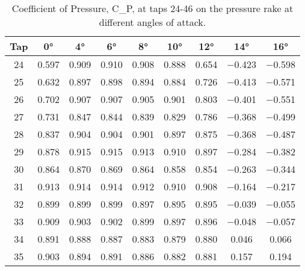\begin{table}[htpb]
    \caption{Coefficient of Pressure, \gls{C_P}, at taps 24-46 on the pressure rake at different angles of attack.}
    \label{tab:C_P_data_2}
    \centering
    \begin{tabular}{ccccccccc}
        \toprule
        Tap & \num{0}\unit{\degree} & \num{4}\unit{\degree} & \num{6}\unit{\degree} & \num{8}\unit{\degree} & \num{10}\unit{\degree} & \num{12}\unit{\degree} & \num{14}\unit{\degree} & \num{16}\unit{\degree}\\
        \midrule
        \num{24} & \num{0.597} & \num{0.909} & \num{0.910} & \num{0.908} & \num{0.888} & \num{0.654} & \num{-0.423} & \num{-0.598} \\
        \num{25} & \num{0.632} & \num{0.897} & \num{0.898} & \num{0.894} & \num{0.884} & \num{0.726} & \num{-0.413} & \num{-0.571} \\
        \num{26} & \num{0.702} & \num{0.907} & \num{0.907} & \num{0.905} & \num{0.901} & \num{0.803} & \num{-0.401} & \num{-0.551} \\
        \num{27} & \num{0.731} & \num{0.847} & \num{0.844} & \num{0.839} & \num{0.829} & \num{0.786} & \num{-0.368} & \num{-0.499} \\
        \num{28} & \num{0.837} & \num{0.904} & \num{0.904} & \num{0.901} & \num{0.897} & \num{0.875} & \num{-0.368} & \num{-0.487} \\
        \num{29} & \num{0.878} & \num{0.915} & \num{0.915} & \num{0.913} & \num{0.910} & \num{0.897} & \num{-0.284} & \num{-0.382} \\
        \num{30} & \num{0.864} & \num{0.870} & \num{0.869} & \num{0.864} & \num{0.858} & \num{0.854} & \num{-0.263} & \num{-0.344} \\
        \num{31} & \num{0.913} & \num{0.914} & \num{0.914} & \num{0.912} & \num{0.910} & \num{0.908} & \num{-0.164} & \num{-0.217} \\
        \num{32} & \num{0.899} & \num{0.899} & \num{0.899} & \num{0.897} & \num{0.895} & \num{0.895} & \num{-0.039} & \num{-0.055} \\
        \num{33} & \num{0.909} & \num{0.903} & \num{0.902} & \num{0.899} & \num{0.897} & \num{0.896} & \num{-0.048} & \num{-0.057} \\
        \num{34} & \num{0.891} & \num{0.888} & \num{0.887} & \num{0.883} & \num{0.879} & \num{0.880} & \num{0.046} & \num{0.066} \\
        \num{35} & \num{0.903} & \num{0.894} & \num{0.891} & \num{0.886} & \num{0.882} & \num{0.881} & \num{0.157} & \num{0.194} \\

\end{tabular}
\end{table}
